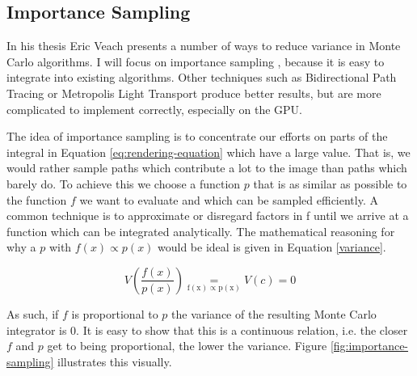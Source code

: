 \documentclass{ACGSeminar}
\begin{document}
\subsection{Importance Sampling}
In his thesis Eric Veach presents a number of ways to reduce variance in Monte Carlo algorithms. \cite[45--70]{veach1997robust} I will focus on importance sampling \cite[47--48]{veach1997robust}, because it is easy to integrate into existing algorithms. Other techniques such as Bidirectional Path Tracing or Metropolis Light Transport produce better results, but are more complicated to implement correctly, especially on the GPU.

The idea of importance sampling is to concentrate our efforts on parts of the integral in Equation \eqref{eq:rendering-equation} which have a large value. That is, we would rather sample paths which contribute a lot to the image than paths which barely do. To achieve this we choose a function $p$ that is as similar as possible to the function $f$ we want to evaluate and which can be sampled efficiently. A common technique is to approximate or disregard factors in f until we arrive at a function which can be integrated analytically. The mathematical reasoning for why a $p$ with $f(x) \propto p(x)$ would be ideal is given in Equation \eqref{variance}.

\begin{equation}\label{variance}
V(\frac{f(x)}{p(x)}) \underset{\mathrm{f(x) \propto p(x)}}{=} V(c) = 0 
\end{equation}

As such, if $f$ is proportional to $p$ the variance of the resulting Monte Carlo integrator is $0$. It is easy to show that this is a continuous relation, i.e. the closer $f$ and $p$ get to being proportional, the lower the variance. Figure \ref{fig:importance-sampling} illustrates this visually.
\end{document}
